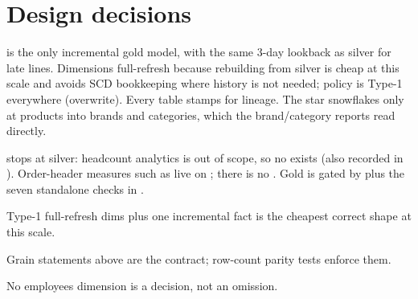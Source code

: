 \section{Design decisions}

 is the only incremental gold model, with the same 3-day lookback as silver for late lines. Dimensions full-refresh because rebuilding from silver is cheap at this scale and avoids SCD bookkeeping where history is not needed; policy is Type-1 everywhere (overwrite). Every table stamps  for lineage. The star snowflakes only at products into brands and categories, which the brand/category reports read directly.

 stops at silver: headcount analytics is out of scope, so no  exists (also recorded in ). Order-header measures such as  live on ; there is no . Gold is gated by  plus the seven standalone checks in .

\begin{keybox}
\item Type-1 full-refresh dims plus one incremental fact is the cheapest correct shape at this scale.
\item Grain statements above are the contract; row-count parity tests enforce them.
\item No employees dimension is a decision, not an omission.
\end{keybox}
